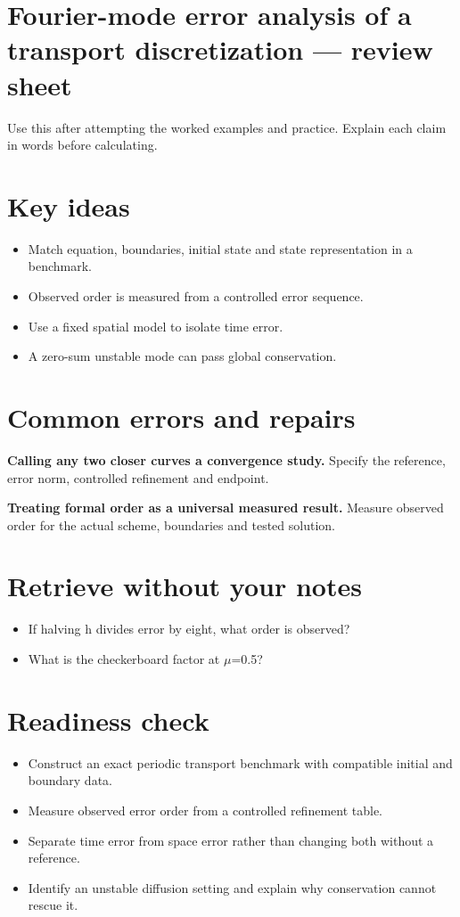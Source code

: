 \documentclass[11pt,letterpaper]{article}
\theoremstyle{definition}\newtheorem{definition}{Definition}\newtheorem{example}{Example}
\numberwithin{equation}{section}
\begin{document}
\section*{Fourier-mode error analysis of a transport discretization --- review sheet}
Use this after attempting the worked examples and practice. Explain each claim in words before calculating.

\section*{Key ideas}
\begin{itemize}
\item Match equation, boundaries, initial state and state representation in a benchmark.
\item Observed order is measured from a controlled error sequence.
\item Use a fixed spatial model to isolate time error.
\item A zero-sum unstable mode can pass global conservation.
\end{itemize}
\section*{Common errors and repairs}
\textbf{Calling any two closer curves a convergence study.} Specify the reference, error norm, controlled refinement and endpoint.

\textbf{Treating formal order as a universal measured result.} Measure observed order for the actual scheme, boundaries and tested solution.

\section*{Retrieve without your notes}
\begin{itemize}
\item If halving h divides error by eight, what order is observed?
\item What is the checkerboard factor at $\mu$=\allowbreak{}0.5?
\end{itemize}
\section*{Readiness check}
\begin{itemize}
\item Construct an exact periodic transport benchmark with compatible initial and boundary data.
\item Measure observed error order from a controlled refinement table.
\item Separate time error from space error rather than changing both without a reference.
\item Identify an unstable diffusion setting and explain why conservation cannot rescue it.
\end{itemize}
\end{document}
